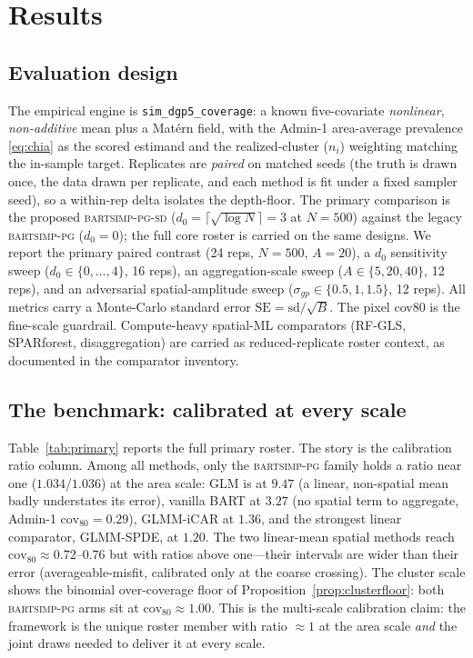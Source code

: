 \documentclass[11pt]{article}
\theoremstyle{remark}
\newcommand{\dz}{d_0}
\newcommand{\bartsimp}{\textsc{bartsimp-pg}}
\newcommand{\bartsimpsd}{\textsc{bartsimp-pg-sd}}
\newcommand{\cov}{\mathrm{cov}}
\begin{document}
\section{Results}\label{sec:results}

\subsection{Evaluation design}\label{sec:evaldesign}

The empirical engine is \texttt{sim\_dgp5\_coverage}: a known five-covariate
\emph{nonlinear, non-additive} mean plus a Mat\'ern field, with the Admin-1
area-average prevalence \eqref{eq:chia} as the scored estimand and the
realized-cluster ($n_i$) weighting matching the in-sample target. Replicates are
\emph{paired} on matched seeds (the truth is drawn once, the data drawn per
replicate, and each method is fit under a fixed sampler seed), so a within-rep
delta isolates the depth-floor. The primary comparison is the proposed
\bartsimpsd{} ($\dz=\lceil\sqrt{\log N}\rceil=3$ at $N=500$) against the legacy
\bartsimp{} ($\dz=0$); the full core roster is carried on the same designs. We
report the primary paired contrast (24 reps, $N=500$, $A=20$), a $\dz$ sensitivity
sweep ($\dz\in\{0,\dots,4\}$, 16 reps), an aggregation-scale sweep
($A\in\{5,20,40\}$, 12 reps), and an adversarial spatial-amplitude sweep
($\sigma_{gp}\in\{0.5,1,1.5\}$, 12 reps). All metrics carry a Monte-Carlo standard
error $\mathrm{SE}=\mathrm{sd}/\sqrt B$. The pixel cov80 is the fine-scale
guardrail. Compute-heavy spatial-ML comparators (RF-GLS, SPARforest,
disaggregation) are carried as reduced-replicate roster context, as documented in
the comparator inventory.

\subsection{The benchmark: calibrated at every scale}\label{sec:benchmark}

Table~\ref{tab:primary} reports the full primary roster. The story is the
calibration ratio column. Among all methods, only the \bartsimp{} family holds a
ratio near one ($1.034$/$1.036$) at the area scale: GLM is at $9.47$ (a linear,
non-spatial mean badly understates its error), vanilla BART at $3.27$ (no spatial
term to aggregate, Admin-1 $\cov_{80}=0.29$), GLMM-iCAR at $1.36$, and the
strongest linear comparator, GLMM-SPDE, at $1.20$. The two linear-mean spatial
methods reach $\cov_{80}\approx0.72$--$0.76$ but with ratios above one---their
intervals are wider than their error (averageable-misfit, calibrated only at the
coarse crossing). The cluster scale shows the binomial over-coverage floor of
Proposition~\ref{prop:clusterfloor}: both \bartsimp{} arms sit at
$\cov_{80}\approx1.00$. This is the multi-scale calibration claim: the framework is
the unique roster member with ratio $\approx1$ at the area scale \emph{and} the
joint draws needed to deliver it at every scale.
\end{document}
